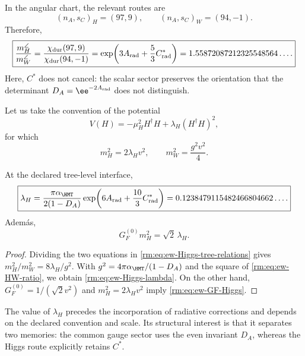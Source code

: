 In the angular chart, the relevant routes are
\begin{equation}
\label{rm:eq:ew-HW-signatures}
(n_A,s_C)_H=(97,9),
\qquad
(n_A,s_C)_W=(94,-1).
\end{equation}
Therefore,
\begin{equation}
\label{rm:eq:ew-HW-ratio}
\boxed{
\frac{m_H^{\angle}}{m_W^{\angle}}
=\frac{\chi_{\rm dur}(97,9)}{\chi_{\rm dur}(94,-1)}
=\exp\!\left(3A_{\rm rad}+\frac53C^*_{\rm rad}\right)
=1.55872087212325548564\ldots .}
\end{equation}
Here, \(C^*\) does not cancel: the scalar sector preserves the orientation
that the determinant \(D_A=\ee^{-2A_{\rm rad}}\) does not distinguish.

Let us take the convention of the potential
\begin{equation}
\label{rm:eq:ew-Higgs-potential}
V(H)=-\mu_H^2H^\dagger H
+\lambda_H(H^\dagger H)^2,
\end{equation}
for which
\begin{equation}
\label{rm:eq:ew-Higgs-tree-relations}
m_H^2=2\lambda_Hv^2,
\qquad
m_W^2=\frac{g^2v^2}{4}.
\end{equation}

\begin{corollary}
\label{rm:cor:ew-Higgs-lambda}
At the declared tree-level interface,
\begin{equation}
\label{rm:eq:ew-Higgs-lambda}
\boxed{
\lambda_H
=\frac{\pi\alpha_{\HMT}}{2(1-D_A)}
\exp\!\left(6A_{\rm rad}+\frac{10}{3}C^*_{\rm rad}\right)
=0.1238479115482466804662\ldots .}
\end{equation}
Adem\'as,
\begin{equation}
\label{rm:eq:ew-GF-Higgs}
G_F^{(0)}m_H^2=\sqrt2\,\lambda_H.
\end{equation}
\end{corollary}

\begin{proof}
Dividing the two equations in
\cref{rm:eq:ew-Higgs-tree-relations} gives
\(m_H^2/m_W^2=8\lambda_H/g^2\). With
\(g^2=4\pi\alpha_{\HMT}/(1-D_A)\) and the square of
\cref{rm:eq:ew-HW-ratio}, we obtain \cref{rm:eq:ew-Higgs-lambda}. On the other hand,
\(G_F^{(0)}=1/(\sqrt2v^2)\) and
\(m_H^2=2\lambda_Hv^2\) imply
\cref{rm:eq:ew-GF-Higgs}.
\end{proof}

The value of \(\lambda_H\) precedes the incorporation of radiative corrections and depends on the declared convention and scale. Its structural interest is that it separates two memories: the common gauge sector uses the even invariant \(D_A\), whereas the Higgs route explicitly retains \(C^*\).

